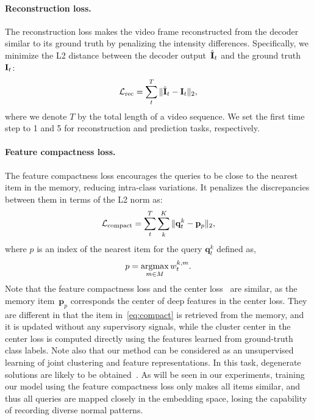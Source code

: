 \documentclass[10pt,twocolumn,letterpaper]{article}
\DeclareMathOperator*{\argmax}{argmax}
\begin{document}
\vspace{-0.3cm}
		\paragraph{Reconstruction loss.}
			The reconstruction loss makes the video frame reconstructed from the decoder similar to its ground truth by penalizing the intensity differences. Specifically, we minimize the L2 distance between the decoder output~$\hat{\bf{I}}_t$ and the ground truth~${\bf{I}}_t$:
			\begin{equation}
\vspace{-0.15cm}
				\mathcal{L}_\mathrm{rec} = \sum_{t}^{T} \|\hat{\bf{I}}_t-{\bf{I}}_t\|_2,
\vspace{-0.1cm}
			\end{equation}
			where we denote $T$ by the total length of a video sequence. We set the first time step to 1 and 5 for reconstruction and prediction tasks, respectively.
			
\vspace{-0.4cm}		
		\paragraph{Feature compactness loss.}
The feature compactness loss encourages the queries to be close to the nearest item in the memory, reducing intra-class variations. It penalizes the discrepancies between them in terms of the L2 norm as:
			\begin{equation}\label{eq:compact}
\vspace{-0.15cm}
				\mathcal{L}_\mathrm{compact}=\sum_{t}^{T} \sum_{k}^{K} \|\mathbf{q}_t^k-\mathbf{p}_{p}\|_2,
\vspace{-0.1cm}
			\end{equation}
			where $p$ is an index of the nearest item for the query $\mathbf{q}_t^k$ defined as, 
			\begin{equation}
\vspace{-0.15cm}
				p = \argmax_{m\in M} w_t^{k,m}.
\end{equation}
Note that the feature compactness loss and the center loss~\cite{wen2016discriminative} are similar, as the memory item~$\mathbf{p}_{p}$ corresponds the center of deep features in the center loss. They are different in that the item in~\eqref{eq:compact} is retrieved from the memory, and it is updated without any supervisory signals, while the cluster center in the center loss is computed directly using the features learned from ground-truth class labels. Note also that our method can be considered as an unsupervised learning of joint clustering and feature representations. In this task, degenerate solutions are likely to be obtained~\cite{wen2016discriminative,yang2016joint}. As will be seen in our experiments, training our model using the feature compactness loss only makes all items similar, and thus all queries are mapped closely in the embedding space, losing the capability of recording diverse normal patterns. 
\end{document}
